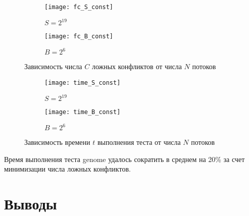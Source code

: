 \begin{figure}
\centering
\begin{subfigure}{0.5\textwidth}
  \centering
  \texttt{[image: fc\_S\_const]}
  \caption{$S = 2^{19}$}
  \label{fc_S_const}
\end{subfigure}%
\begin{subfigure}{0.5\textwidth}
  \centering
  \texttt{[image: fc\_B\_const]}
  \caption{$B = 2^6$}
  \label{fc_B_const}
\end{subfigure}
\caption{Зависимость числа $C$ ложных конфликтов от числа $N$ потоков}
\label{fc_N}
\end{figure}

\begin{figure}
\centering
\begin{subfigure}{0.5\textwidth}
  \centering
  \texttt{[image: time\_S\_const]}
  \caption{$S = 2^{19}$}
  \label{time_S_const}
\end{subfigure}%
\begin{subfigure}{0.5\textwidth}
  \centering
  \texttt{[image: time\_B\_const]}
  \caption{$B = 2^6$}
  \label{time_B_const}
\end{subfigure}
\caption{Зависимость времени $t$ выполнения теста от числа $N$ потоков}
\label{time_N}
\end{figure}

Время выполнения теста genome удалось сократить в среднем на 20\% за счет 
минимизации числа ложных конфликтов.

\section{Выводы}










\clearpage


